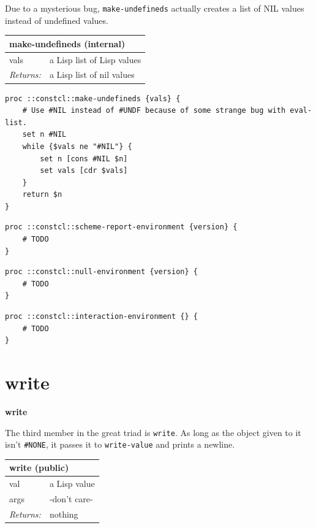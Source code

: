 \documentclass[twoside,9pt]{report}
\begin{document}
Due to a mysterious bug, \texttt{make-undefineds} actually creates a list of NIL values instead of undefined values.

\begin{tabular}{ |l l| }
\hline
\multicolumn{2}{|l|}{make-undefineds (internal)} \\
\hline
vals & a Lisp list of Lisp values \\
\textit{Returns:} & a Lisp list of nil values \\
\hline
\end{tabular}

\noindent\makebox[\linewidth]{\rule{\linewidth}{0.4pt}}
\begin{lstlisting}
proc ::constcl::make-undefineds {vals} {
    # Use #NIL instead of #UNDF because of some strange bug with eval-list.
    set n #NIL
    while {$vals ne "#NIL"} {
        set n [cons #NIL $n]
        set vals [cdr $vals]
    }
    return $n
}
\end{lstlisting}
\noindent\makebox[\linewidth]{\rule{\linewidth}{0.4pt}}
\noindent\makebox[\linewidth]{\rule{\linewidth}{0.4pt}}
\begin{lstlisting}
proc ::constcl::scheme-report-environment {version} {
    # TODO
}
\end{lstlisting}
\noindent\makebox[\linewidth]{\rule{\linewidth}{0.4pt}}
\noindent\makebox[\linewidth]{\rule{\linewidth}{0.4pt}}
\begin{lstlisting}
proc ::constcl::null-environment {version} {
    # TODO
}
\end{lstlisting}
\noindent\makebox[\linewidth]{\rule{\linewidth}{0.4pt}}
\noindent\makebox[\linewidth]{\rule{\linewidth}{0.4pt}}
\begin{lstlisting}
proc ::constcl::interaction-environment {} {
    # TODO
}
\end{lstlisting}
\noindent\makebox[\linewidth]{\rule{\linewidth}{0.4pt}}
\section{write}
\label{write}

\textbf{write}


The third member in the great triad is \texttt{write}. As long as the object given to it isn't \texttt{\#NONE}, it passes it to \texttt{write-value} and prints a newline.

\begin{tabular}{ |l l| }
\hline
\multicolumn{2}{|l|}{write (public)} \\
\hline
val & a Lisp value \\
args & -don't care- \\
\textit{Returns:} & nothing \\
\hline
\end{tabular}
\end{document}
